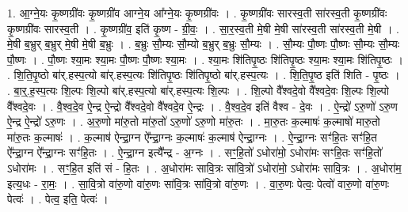 \documentclass[17pt]{extarticle}
\begin{document}
1. आ॒ग्ने॒यः कृ॒ष्णग्री॑वः कृ॒ष्णग्री॑व आग्ने॒य आ᳚ग्ने॒यः कृ॒ष्णग्री॑वः । . कृ॒ष्णग्री॑वः सारस्व॒ती सा॑रस्व॒ती कृ॒ष्णग्री॑वः कृ॒ष्णग्री॑वः सारस्व॒ती । . कृ॒ष्णग्री॑व॒ इति॑ कृ॒ष्ण - ग्री॒वः॒ । . सा॒र॒स्व॒ती मे॒षी मे॒षी सा॑रस्व॒ती सा॑रस्व॒ती मे॒षी । . मे॒षी ब॒भ्रुर् ब॒भ्रुर् मे॒षी मे॒षी ब॒भ्रुः । . ब॒भ्रुः सौ॒म्यः सौ॒म्यो ब॒भ्रुर् ब॒भ्रुः सौ॒म्यः । . सौ॒म्यः पौ॒ष्णः पौ॒ष्णः सौ॒म्यः सौ॒म्यः पौ॒ष्णः । . पौ॒ष्णः श्या॒मः श्या॒मः पौ॒ष्णः पौ॒ष्णः श्या॒मः । . श्या॒मः शि॑तिपृ॒ष्ठः शि॑तिपृ॒ष्ठः श्या॒मः श्या॒मः शि॑तिपृ॒ष्ठः । . शि॒ति॒पृ॒ष्ठो बा॑र्.हस्प॒त्यो बा॑र्.हस्प॒त्यः शि॑तिपृ॒ष्ठः शि॑तिपृ॒ष्ठो बा॑र्.हस्प॒त्यः । . शि॒ति॒पृ॒ष्ठ इति॑ शिति - पृ॒ष्ठः । . बा॒र्॒.ह॒स्प॒त्यः शि॒ल्पः शि॒ल्पो बा॑र्.हस्प॒त्यो बा॑र्.हस्प॒त्यः शि॒ल्पः । . शि॒ल्पो वै᳚श्वदे॒वो वै᳚श्वदे॒वः शि॒ल्पः शि॒ल्पो वै᳚श्वदे॒वः । . वै॒श्व॒दे॒व ऐ॒न्द्र ऐ॒न्द्रो वै᳚श्वदे॒वो वै᳚श्वदे॒व ऐ॒न्द्रः । . वै॒श्व॒दे॒व इति॑ वैश्व - दे॒वः । . ऐ॒न्द्रो॑ ऽरु॒णो॑ ऽरु॒ण ऐ॒न्द्र ऐ॒न्द्रो॑ ऽरु॒णः । . अ॒रु॒णो मा॑रु॒तो मा॑रु॒तो॑ ऽरु॒णो॑ ऽरु॒णो मा॑रु॒तः । . मा॒रु॒तः क॒ल्माषः॑ क॒ल्माषो॑ मारु॒तो मा॑रु॒तः क॒ल्माषः॑ । . क॒ल्माष॑ ऐन्द्रा॒ग्न ऐ᳚न्द्रा॒ग्नः क॒ल्माषः॑ क॒ल्माष॑ ऐन्द्रा॒ग्नः । . ऐ॒न्द्रा॒ग्नः सꣳ॑हि॒तः सꣳ॑हि॒त ऐ᳚न्द्रा॒ग्न ऐ᳚न्द्रा॒ग्नः सꣳ॑हि॒तः । . ऐ॒न्द्रा॒ग्न इत्यै᳚न्द्र - अ॒ग्नः । . सꣳ॒॒हि॒तो॑ ऽधोरा॑मो॒ ऽधोरा॑मः सꣳहि॒तः सꣳ॑हि॒तो॑ ऽधोरा॑मः । . सꣳ॒॒हि॒त इति॑ सं - हि॒तः । . अ॒धोरा॑मः सावि॒त्रः सा॑वि॒त्रो॑ ऽधोरा॑मो॒ ऽधोरा॑मः सावि॒त्रः । . अ॒धोरा॑म॒ इत्य॒धः - रा॒मः॒ । . सा॒वि॒त्रो वा॑रु॒णो वा॑रु॒णः सा॑वि॒त्रः सा॑वि॒त्रो वा॑रु॒णः । . वा॒रु॒णः पेत्वः॒ पेत्वो॑ वारु॒णो वा॑रु॒णः पेत्वः॑ । . पेत्व॒ इति॒ पेत्वः॑ । \newline
\end{document}
